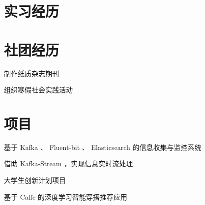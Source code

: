 \documentclass[]{deedy-resume-openfont}
\begin{document}
\begin{minipage}[t]{0.73\textwidth} 


\section{实习经历}
\sectionsep


\sectionsep

\section{社团经历}
\sectionsep

\begin{tightemize}
    \item
    \item 制作纸质杂志期刊
\end{tightemize}

\sectionsep

\begin{tightemize}
    \item 组织寒假社会实践活动
\end{tightemize}

\sectionsep


\section{项目}
\sectionsep

\begin{tightemize}
    \item 基于 Kafka 、 Fluent-bit 、 Elasticsearch 的信息收集与监控系统
    \item 借助 Kafka-Stream ，实现信息实时流处理
\end{tightemize}
\sectionsep

\begin{tightemize}
    \item 大学生创新计划项目
    \item 基于 Caffe 的深度学习智能穿搭推荐应用
\end{tightemize}


\end{minipage}
\end{document}
